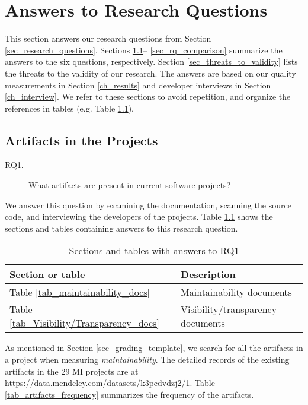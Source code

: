 \chapter{Answers to Research Questions}
\label{ch_answers}

This section answers our research questions from Section \ref{sec_research_questions}.  Sections \ref{sec_rq_artifacts}-- \ref{sec_rq_comparison} summarize the answers to the six questions, respectively. Section \ref{sec_threats_to_validity} lists the threats to the validity of our research. The answers are based on our quality measurements in Section \ref{ch_results} and developer interviews in Section \ref{ch_interview}. We refer to these sections to avoid repetition, and organize the references in tables (e.g. Table \ref{tab_reference_rq1}).

\section{Artifacts in the Projects}
\label{sec_rq_artifacts}
\begin{description}
\item[RQ1.] What artifacts are present in current software projects?
\end{description}

We answer this question by examining the documentation, scanning the source code, and interviewing the developers of the projects. Table \ref{tab_reference_rq1} shows the sections and tables containing answers to this research question.

\begin{table}[H]
\centering
\begin{tabular}{ll}
\hline
Section or table & Description \\ \hline
Table \ref{tab_maintainability_docs} & Maintainability documents \\
Table \ref{tab_Visibility/Transparency_docs} & Visibility/transparency documents \\ \hline
\end{tabular}
\caption{\label{tab_reference_rq1}Sections and tables with answers to RQ1}
\end{table}

As mentioned in Section \ref{sec_grading_template}, we search for all the artifacts in a project when measuring \textit{maintainability}. The detailed records of the existing artifacts in the 29 MI projects are at \hyperlink{https://data.mendeley.com/datasets/k3pcdvdzj2/1}{https://data.mendeley.com/datasets/k3pcdvdzj2/1}. Table \ref{tab_artifacts_frequency} summarizes the frequency of the artifacts.

